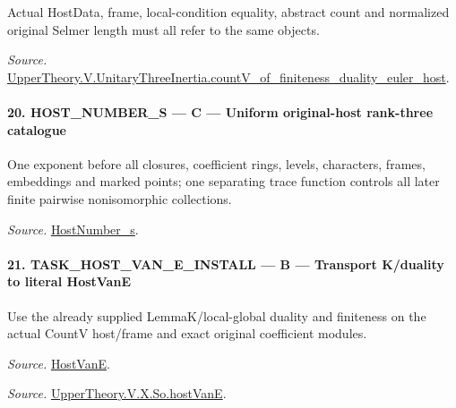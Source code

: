 Actual HostData, frame, local-condition equality, abstract count and normalized original Selmer length must all refer to the same objects.

\emph{Source.} \href{https://github.com/CocoSgt/riemann-hypothesis-lean/blob/7cbf7a0c32fca1badf05931879a37c3f8a2b03b4/src/Development/AutomorphicArithmetic/AutomorphicVarieties/ModularityArgument/ThresholdArguments/DenseThresholdCases/CountVOf.lean#L33-L60}{UpperTheory.V.UnitaryThreeInertia.countV\_\allowbreak of\_\allowbreak finiteness\_\allowbreak duality\_\allowbreak euler\_\allowbreak host}.



\paragraph{20. HOST\_\allowbreak NUMBER\_\allowbreak S — C — Uniform original-host rank-three catalogue}

One exponent before all closures, coefficient rings, levels, characters, frames, embeddings and marked points; one separating trace function controls all later finite pairwise nonisomorphic collections.

\emph{Source.} \href{https://github.com/CocoSgt/riemann-hypothesis-lean/blob/7cbf7a0c32fca1badf05931879a37c3f8a2b03b4/src/Development/AutomorphicArithmetic/AutomorphicVarieties/ModularityArgument/ThresholdArguments/DenseThresholdCases/HostNumberS.lean#L18-L28}{HostNumber\_\allowbreak s}.



\paragraph{21. TASK\_\allowbreak HOST\_\allowbreak VAN\_\allowbreak E\_\allowbreak INSTALL — B — Transport K/duality to literal HostVanE}

Use the already supplied LemmaK/local-global duality and finiteness on the actual CountV host/frame and exact original coefficient modules.

\emph{Source.} \href{https://github.com/CocoSgt/riemann-hypothesis-lean/blob/7cbf7a0c32fca1badf05931879a37c3f8a2b03b4/src/Development/AutomorphicArithmetic/AutomorphicVarieties/UnitaryThreeDeformations/HostNumber.lean#L9-L12}{HostVanE}.

\emph{Source.} \href{https://github.com/CocoSgt/riemann-hypothesis-lean/blob/7cbf7a0c32fca1badf05931879a37c3f8a2b03b4/src/Development/AutomorphicArithmetic/AutomorphicVarieties/LevelCohomology/SoHostVanE.lean#L11-L18}{UpperTheory.V.X.So.hostVanE}.



